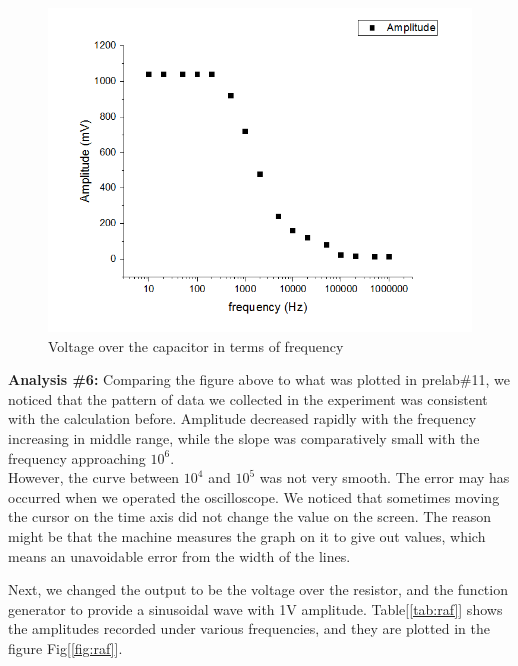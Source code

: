 \begin{figure}[!htbp]
	\centering
	\includegraphics[width=\linewidth]{images/c-amp-freq.png}
	\caption{Voltage over the capacitor in terms of frequency}
	\label{fig:caf}
\end{figure}

\hfill \newline
\textbf{Analysis \#6:} \newline
\phantom{ } Comparing the figure above to what was plotted in prelab\#11, we noticed that the pattern of data we collected in the experiment was consistent with the calculation before. Amplitude decreased rapidly with the frequency increasing in middle range, while the slope was comparatively small with the frequency approaching $10^6$.\\
\phantom{ } However, the curve between $10^4$ and $10^5$ was not very smooth. The error may has occurred when we operated the oscilloscope. We noticed that sometimes moving the cursor on the time axis did not change the value on the screen. The reason might be that the machine measures the graph on it to give out values, which means an unavoidable error from the width of the lines.

\phantom{ } Next, we changed the output to be the voltage over the resistor, and the function generator to provide a sinusoidal wave with 1V amplitude. Table[\ref{tab:raf}] shows the amplitudes recorded under various frequencies, and they are plotted in the figure Fig[\ref{fig:raf}].

